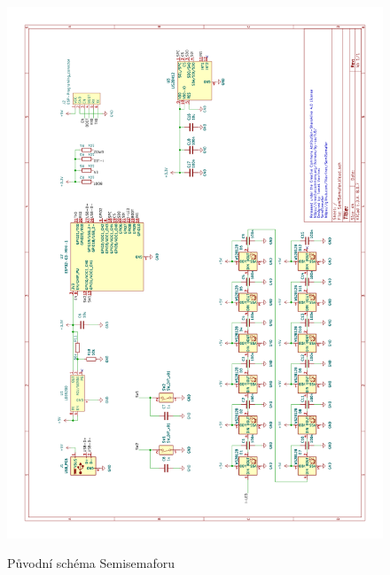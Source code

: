 \begin{figure}[!h]
	\vspace{-10mm}
	\hspace{-20mm}
	\begin{minipage}{1.0\textwidth}
	  \includegraphics[width=1.2\textwidth]{text/PraktickaCast/img/Semisemafor-SCH-V1.png}
	  \label{Semisemafor-sch-v1}
	\end{minipage}
	\vspace{-10mm}
	\caption{Původní schéma Semisemaforu}
\end{figure}
  
